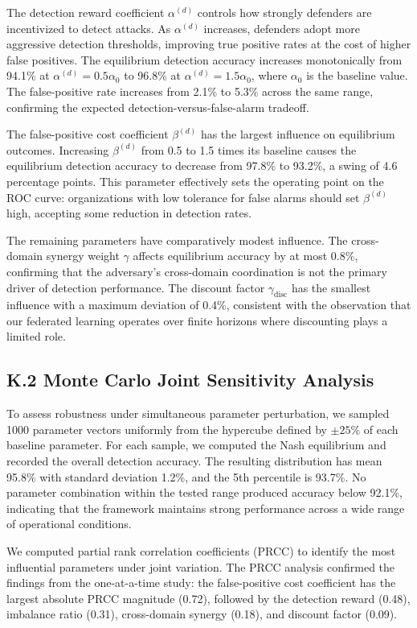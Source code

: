 \documentclass[12pt,a4paper]{article}
\theoremstyle{definition}
\begin{document}
The detection reward coefficient $\alpha^{(d)}$ controls how strongly defenders are incentivized to detect attacks. As $\alpha^{(d)}$ increases, defenders adopt more aggressive detection thresholds, improving true positive rates at the cost of higher false positives. The equilibrium detection accuracy increases monotonically from 94.1\% at $\alpha^{(d)} = 0.5 \alpha_0$ to 96.8\% at $\alpha^{(d)} = 1.5 \alpha_0$, where $\alpha_0$ is the baseline value. The false-positive rate increases from 2.1\% to 5.3\% across the same range, confirming the expected detection-versus-false-alarm tradeoff.

The false-positive cost coefficient $\beta^{(d)}$ has the largest influence on equilibrium outcomes. Increasing $\beta^{(d)}$ from 0.5 to 1.5 times its baseline causes the equilibrium detection accuracy to decrease from 97.8\% to 93.2\%, a swing of 4.6 percentage points. This parameter effectively sets the operating point on the ROC curve: organizations with low tolerance for false alarms should set $\beta^{(d)}$ high, accepting some reduction in detection rates.

The remaining parameters have comparatively modest influence. The cross-domain synergy weight $\gamma$ affects equilibrium accuracy by at most 0.8\%, confirming that the adversary's cross-domain coordination is not the primary driver of detection performance. The discount factor $\gamma_{\text{disc}}$ has the smallest influence with a maximum deviation of 0.4\%, consistent with the observation that our federated learning operates over finite horizons where discounting plays a limited role.

\subsection{K.2 Monte Carlo Joint Sensitivity Analysis}

To assess robustness under simultaneous parameter perturbation, we sampled 1000 parameter vectors uniformly from the hypercube defined by $\pm 25\%$ of each baseline parameter. For each sample, we computed the Nash equilibrium and recorded the overall detection accuracy. The resulting distribution has mean 95.8\% with standard deviation 1.2\%, and the 5th percentile is 93.7\%. No parameter combination within the tested range produced accuracy below 92.1\%, indicating that the framework maintains strong performance across a wide range of operational conditions.

We computed partial rank correlation coefficients (PRCC) to identify the most influential parameters under joint variation. The PRCC analysis confirmed the findings from the one-at-a-time study: the false-positive cost coefficient has the largest absolute PRCC magnitude (0.72), followed by the detection reward (0.48), imbalance ratio (0.31), cross-domain synergy (0.18), and discount factor (0.09).
\end{document}
